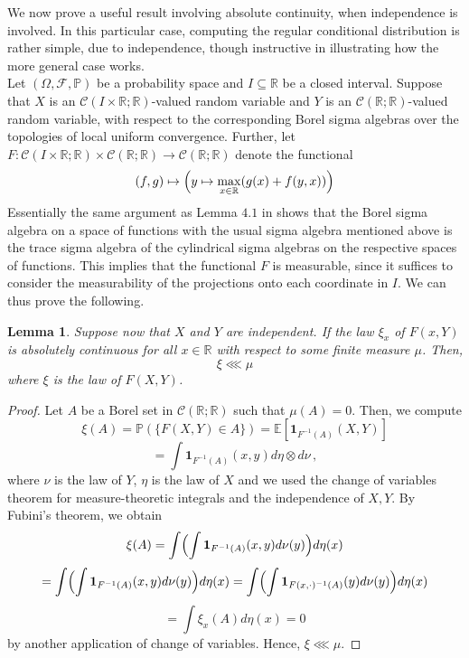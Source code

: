 \documentclass[12pt]{report}
\theoremstyle{plain}
\newtheorem{lemma}[theorem]{Lemma}
\newcommand{\R}{\ensuremath{\mathbb{R}}}
\begin{document}
We now prove a useful result involving absolute continuity, when independence is involved. In this particular case, computing the regular conditional distribution is rather simple, due to independence, though instructive in illustrating how the more general case works.\\

Let $(\Omega, \mathcal{F}, \mathbb{P})$ be a probability space and $I\subseteq \R$ be a closed interval. Suppose that $X$ is an $\mathcal{C}(I\times\R;\R)$-valued random variable and $Y$ is an $\mathcal{C}(\R;\R)$-valued random variable, with respect to the corresponding Borel sigma algebras over the topologies of local uniform convergence. Further, let $F:\mathcal{C}(I\times\R;\R)\times \mathcal{C}(\R;\R)\to \mathcal{C}(\R;\R)$ denote the functional
 \[
 (f,g)\mapsto \Bigl(y\mapsto \displaystyle\max_{x\in\R}(g(x)+f(y,x))\Bigr)
 \]
 Essentially the same argument as Lemma $4.1$ in \cite{schilling2021brownian} shows that the Borel sigma algebra on a space of functions with the usual sigma algebra mentioned above is the trace sigma algebra of the cylindrical sigma algebras on the respective spaces of functions. This implies that the functional $F$ is measurable, since it suffices to consider the measurability of the projections onto each coordinate in $I$. We can thus prove the following.\\

\begin{lemma}\label{lemma:cond independence}
   Suppose now that $X$ and $Y$ are independent. If the law $\xi_x$ of $F(x,Y)$ is absolutely continuous for all $x\in\R$ with respect to some finite measure $\mu$. Then, 
   \[
   \xi\lll\mu
   \]
   where $\xi$ is the law of $F(X,Y)$.
\end{lemma}
\begin{proof}
    Let $A$ be a Borel set in $\mathcal{C}(\R;\R)$ such that $\mu(A) = 0$. Then, we compute
    \[
    \xi(A) = \mathbb{P}(\{F(X,Y)\in A\}) = \mathbb{E}[\mathbf{1}_{F^{-1}(A)}(X,Y)]
    \]
    \[
    = \displaystyle\int \mathbf{1}_{F^{-1}(A)}(x,y)d\eta\otimes d\nu\,,
    \]
    where $\nu$ is the law of $Y$, $\eta$ is the law of $X$ and we used the change of variables theorem for measure-theoretic integrals and the independence of $X,Y$. By Fubini's theorem, we obtain 
    \[
    \xi(A) = \displaystyle\int \Bigl(\int \mathbf{1}_{F^{-1}(A)}(x,y)d\nu(y) \Bigr)d\eta(x)
    \]
    \[
    = \displaystyle\int \Bigl(\int \mathbf{1}_{F^{-1}(A)}(x,y)d\nu(y) \Bigr)d\eta(x) = \displaystyle\int \Bigl(\int \mathbf{1}_{F(x,\cdot)^{-1}(A)}(y)d\nu(y) \Bigr)d\eta(x)
    \]
    \[
    = \displaystyle\int \xi_x(A)d\eta(x) = 0
    \]
    by another application of change of variables. Hence, $\xi\lll\mu$.
\end{proof}
\end{document}
